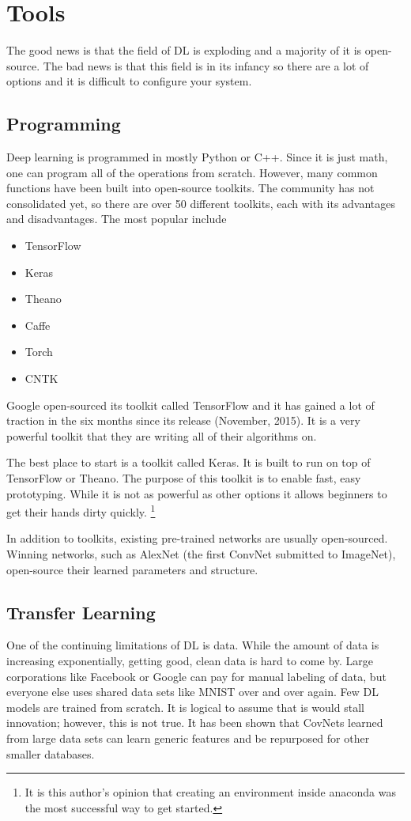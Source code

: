 \section{Tools}
The good news is that the field of DL is exploding and a majority of it is open-source.  The bad news is that this field is in its infancy so there are a lot of options and it is difficult to configure your system.  
 
\subsection{Programming}
Deep learning is programmed in mostly Python or C++. Since it is just math, one can program all of the operations from scratch.  However, many common functions have been built into open-source toolkits.  The community has not consolidated yet, so there are over 50 different toolkits, each with its advantages and disadvantages.  The most popular include
\begin{itemize}
\item TensorFlow
\item Keras
\item Theano
\item Caffe
\item Torch
\item CNTK
\end{itemize}

Google open-sourced its toolkit called TensorFlow and it has gained a lot of traction in the six months since its release (November, 2015).  It is a very powerful toolkit that they are writing all of their algorithms on.  

The best place to start is a toolkit called Keras.  It is built to run on top of TensorFlow or Theano.  The purpose of this toolkit is to enable fast, easy prototyping.  While it is not as powerful as other options it allows beginners to get their hands dirty quickly. \footnote{It is this author's opinion that creating an environment inside anaconda was the most successful way to get started.}

In addition to toolkits, existing pre-trained networks are usually open-sourced.  Winning networks, such as AlexNet (the first ConvNet submitted to ImageNet), open-source their learned parameters and structure.  

\subsection{Transfer Learning}
One of the continuing limitations of DL is data.  While the amount of data is increasing exponentially, getting good, clean data is hard to come by.  Large corporations like Facebook or Google can pay for manual labeling of data, but everyone else uses shared data sets like MNIST over and over again.  Few DL models are trained from scratch.  It is logical to assume that is would stall innovation; however, this is not true.  It has been shown that CovNets learned from large data sets can learn generic features and be repurposed for other smaller databases. \cite{lin2015learning} 

